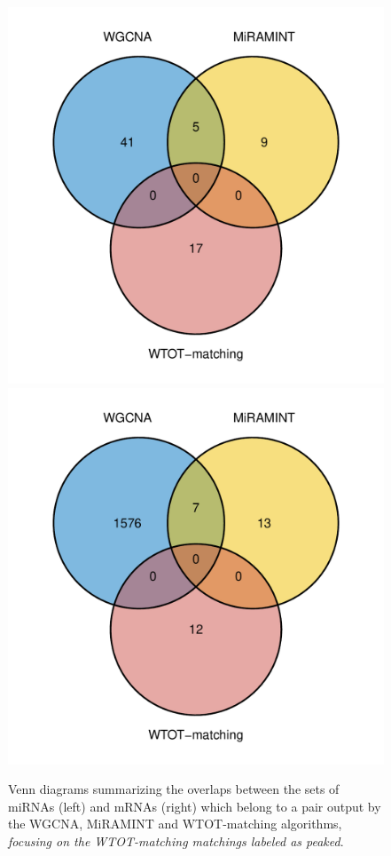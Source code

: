 \begin{figure}
  \centering
  \includegraphics[width=.45\textwidth]{images/miRNA_striatum_peak.pdf}
  \includegraphics[width=.45\textwidth]{images/mRNA_striatum_peak.pdf}
  \caption{Venn diagrams summarizing  the overlaps between the  sets of miRNAs
    (left)  and mRNAs  (right) which  belong to  a pair  output by  the WGCNA,
    MiRAMINT   and   WTOT-matching   algorithms,   \textit{focusing   on   the
      WTOT-matching matchings labeled as peaked}.}
  \label{fig:venn:peaked}
\end{figure}


